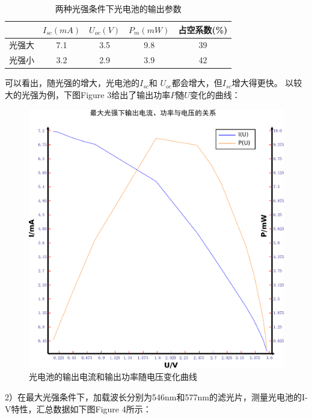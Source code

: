﻿\documentclass[10.5pt]{article}
\begin{document}
\begin{table}[!ht]
\centering
\begin{tabular}{ccccc}
\hline
&$I_{sc}(mA)$&$U_{oc}(V)$&$P_m(mW)$&占空系数(\%)\\
\hline
光强大&7.1&3.5&9.8&39\\
光强小&3.2&2.9&3.9&42\\
\hline
\end{tabular}
\caption{两种光强条件下光电池的输出参数}
\end{table}

可以看出，随光强的增大，光电池的$I_{sc}$和 $U_{oc}$都会增大，但$I_{sc}$增大得更快。
以较大的光强为例，下图Figure 3给出了输出功率$P$随$U$变化的曲线：
\begin{figure}[!ht]
\centering
\caption{光电池的输出电流和输出功率随电压变化曲线}
\includegraphics[width=400pt]{OutputSolarCellCurve.pdf}
\end{figure}
2）在最大光强条件下，加载波长分别为546nm和577nm的滤光片，测量光电池的I-V特性，汇总数据如下图Figure 4所示：
\end{document}

